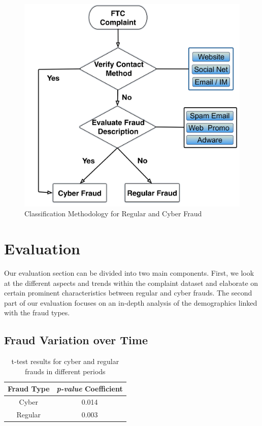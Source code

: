 \documentclass[conference]{IEEEtran}
\begin{document}
\begin{figure}[t]
\centering
  \includegraphics[scale=0.28]{graphics/methodology.png}
  \caption{Classification Methodology for Regular and Cyber Fraud}
  \label{classify}
\end{figure}

\section{Evaluation}\label{eval}

Our evaluation section can be divided into two main components. First, we look at the different aspects and trends within the complaint dataset and elaborate on certain prominent characteristics between regular and cyber frauds. The second part of our evaluation focuses on an in-depth analysis of the demographics linked with the fraud types.



\subsection{Fraud Variation over Time}

\begin{table}[b]
\centering
\begin{tabular}{cc}
\hline
\multicolumn{1}{c}{\bfseries Fraud Type} & \multicolumn{1}{c}{\bfseries \emph{p-value}
Coefficient}
\\
\hline
\hline
Cyber & 0.014\\
\hline
Regular & 0.003\\
\hline
\end{tabular}
\vspace{8pt}
\caption{t-test results for cyber and regular frauds in different periods}\label{ttest}
\vspace{-10pt}
\end{table}
\end{document}
